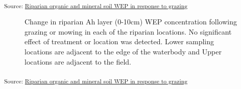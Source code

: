 \documentclass[
]{agujournal2019}
\begin{document}
\textsubscript{Source:
\href{https://alex-koiter.github.io/riparian-grazing-manuscript/notebooks/03_Soils_analysis-preview.html\#cell-tbl-organic-posthoc}{Riparian
organic and mineral soil WEP in response to grazing}}

\begin{figure}[H]


\caption{\label{fig-soil-wep}Change in riparian Ah layer (0-10cm) WEP
concentration following grazing or mowing in each of the riparian
locations. No significant effect of treatment or location was detected.
Lower sampling locations are adjacent to the edge of the waterbody and
Upper locations are adjacent to the field.}

\end{figure}%

\textsubscript{Source:
\href{https://alex-koiter.github.io/riparian-grazing-manuscript/notebooks/03_Soils_analysis-preview.html\#cell-fig-soil-WEP}{Riparian
organic and mineral soil WEP in response to grazing}}
\end{document}
